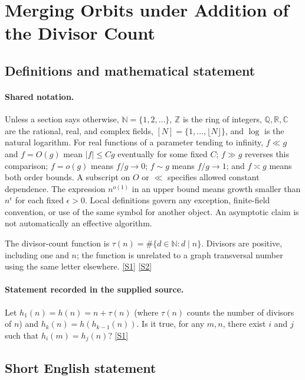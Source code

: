 \documentclass[11pt,a4paper]{article}
\newcommand{\N}{\mathbb{N}}
\newcommand{\Z}{\mathbb{Z}}
\newcommand{\Q}{\mathbb{Q}}
\newcommand{\R}{\mathbb{R}}
\newcommand{\C}{\mathbb{C}}
\newcommand{\sref}[2]{\hyperlink{source:#1:#2}{[S#2]}}
\begin{document}
\section{Merging Orbits under Addition of the Divisor Count}\label{statement}


\subsection{Definitions and mathematical statement}

\paragraph{Shared notation.}Unless a section says otherwise, $\N=\{1,2,\ldots\}$,
$\Z$ is the ring of integers, $\Q,\R,\C$ are the rational, real, and complex
fields, $[N]=\{1,\ldots,\lfloor N\rfloor\}$, and $\log$ is the natural
logarithm. For real functions of a parameter tending to infinity,
$f\ll g$ and $f=O(g)$ mean $|f|\leq Cg$ eventually for some fixed $C$;
$f\gg g$ reverses this comparison; $f=o(g)$ means $f/g\to0$;
$f\sim g$ means $f/g\to1$; and $f\asymp g$ means both order bounds.
A subscript on $O$ or $\ll$ specifies allowed constant dependence.
The expression $n^{o(1)}$ in an upper bound means growth smaller than
$n^\epsilon$ for each fixed $\epsilon>0$. Local definitions govern any
exception, finite-field convention, or use of the same symbol for another
object. An asymptotic claim is not automatically an effective algorithm.



The divisor-count function is $\tau(n)=\#\{d\in\N:d\mid n\}$. Divisors are positive, including one and $n$; the function is unrelated to a graph transversal number using the same letter elsewhere. \sref{statement}{1} \sref{statement}{2}

\paragraph{Statement recorded in the supplied source.}
Let $h_1(n)=h(n)=n+\tau(n)$ (where $\tau(n)$ counts the number of divisors of $n$) and $h_k(n)=h(h_{k-1}(n))$. Is it true, for any $m,n$, there exist $i$ and $j$ such that $h_i(m)=h_j(n)$? \sref{statement}{1}

\subsection{Short English statement}
\end{document}

